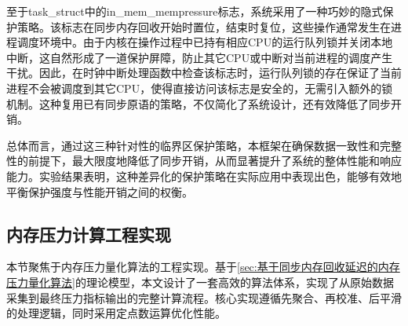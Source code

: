 至于task\_struct中的in\_mem\_mempressure标志，系统采用了一种巧妙的隐式保护策略。该标志在同步内存回收开始时置位，结束时复位，这些操作通常发生在进程调度环境中。由于内核在操作过程中已持有相应CPU的运行队列锁并关闭本地中断，这自然形成了一道保护屏障，防止其它CPU或中断对当前进程的调度产生干扰。因此，在时钟中断处理函数中检查该标志时，运行队列锁的存在保证了当前进程不会被调度到其它CPU，使得直接访问该标志是安全的，无需引入额外的锁机制。这种复用已有同步原语的策略，不仅简化了系统设计，还有效降低了同步开销。

总体而言，通过这三种针对性的临界区保护策略，本框架在确保数据一致性和完整性的前提下，最大限度地降低了同步开销，从而显著提升了系统的整体性能和响应能力。实验结果表明，这种差异化的保护策略在实际应用中表现出色，能够有效地平衡保护强度与性能开销之间的权衡。

\subsection{内存压力计算工程实现}
\label{sec:内存压力计算算法}
本节聚焦于内存压力量化算法的工程实现。基于\ref{sec:基于同步内存回收延迟的内存压力量化算法}的理论模型，本文设计了一套高效的算法体系，实现了从原始数据采集到最终压力指标输出的完整计算流程。核心实现遵循先聚合、再校准、后平滑的处理逻辑，同时采用定点数运算优化性能。



